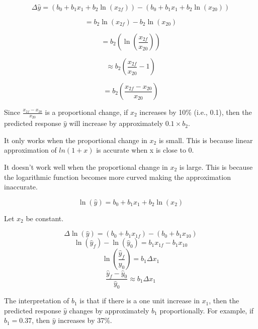 \documentclass[12pt]{article}
\begin{document}
\begin{enumerate}
\[
\Delta \hat{y} = \left(b_0 + b_1 x_1 + b_2 \ln(x_{2f})\right) - \left(b_0 + b_1 x_1 + b_2 \ln(x_{20})\right)
\]

\[
= b_2 \ln(x_{2f}) - b_2 \ln(x_{20})
\]

\[
= b_2 \left( \ln\left( \frac{x_{2f}}{x_{20}} \right) \right)
\]

\[
\approx b_2 \left( \frac{x_{2f}}{x_{20}} - 1 \right)
\]

\[
= b_2 \left( \frac{x_{2f} - x_{20}}{x_{20}} \right)
\]

Since \( \frac{x_{2f} - x_{20}}{x_{20}} \) is a proportional change,  
if \( x_2 \) increases by 10\% (i.e., 0.1),  
then the predicted response \( \hat{y} \) will increase by approximately \( 0.1 \times b_2 \).


It only works when the proportional change in $x_2$ is small. This is because linear approximation of $ln(1 + x)$ is accurate when x is close to 0.

It doesn't work well when the proportional change in $x_2$ is large. This is because the logarithmic function becomes more curved making the approximation inaccurate. 


\[
\ln(\hat{y}) = b_0 + b_1 x_1 + b_2 \ln(x_2)
\]

Let \( x_2 \) be constant.

\[
\Delta \ln(\hat{y}) = \left( b_0 + b_1 x_{1f} \right) - \left( b_0 + b_1 x_{10} \right)
\]
\[
\ln(\hat{y}_f) - \ln(\hat{y}_0) = b_1 x_{1f} - b_1 x_{10}
\]
\[
\ln\left( \frac{\hat{y}_f}{\hat{y}_0} \right) = b_1 \Delta x_1
\]
\[
\frac{\hat{y}_f - \hat{y}_0}{\hat{y}_0} \approx b_1 \Delta x_1
\]

The interpretation of \( b_1 \) is that if there is a one unit increase in \( x_1 \), then the predicted response \( \hat{y} \) changes by approximately \( b_1 \) proportionally.  
For example, if \( b_1 = 0.37 \), then \( \hat{y} \) increases by 37\%.

\vspace{1em}


\end{enumerate}
\end{document}
